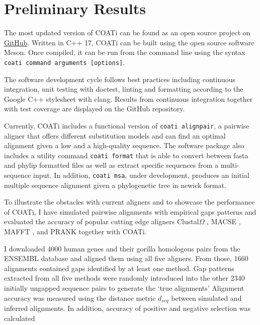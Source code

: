 \section{Preliminary Results}


The most updated version of COATi can be found as an open source project on
\href{https://www.github.com/jgarciamesa/coati}{GitHub}.
Written in C++ 17, COATi can be built using the open source software Meson.
Once compiled, it can be run from the command line using the syntax
\texttt{coati command arguments [options]}.

The software development cycle follows best practices including continuous
integration, unit testing with doctest, linting and formatting according to the
Google C++ stylesheet with clang.
Results from continuous integration together with test coverage are displayed
on the GitHub repository.

Currently, COATi includes a functional version of \texttt{coati alignpair}, a
pairwise aligner that offers different substitution models and can find an
optimal alignment given a low and a high-quality sequence.
The software package also includes a utility command \verb|coati format| that is
able to convert between fasta and phylip formatted files as well as extract
specific sequences from a multi-sequence input.
In addition, \texttt{coati msa}, under development, produces an initial multiple
sequence alignment given a phylogenetic tree in newick format.

To illustrate the obstacles with current aligners and to showcase the
performance of COATi, I have simulated pairwise alignments with empirical gaps
patterns and evaluated the accuracy of popular cutting edge aligners
Clustal$\Omega$ \parencite{clustal_omega_sievers_2011}, MACSE
\parencite{ranwez_macse_2011}, MAFFT \parencite{mafft_katoh_2002}, and PRANK
\parencite{prank_loytynoja_2014} together with COATi.

I downloaded 4000 human genes and their gorilla homologous pairs from the
ENSEMBL database \parencite{ensembl_hubbard_2002} and aligned them using all
five aligners.
From those, 1660 alignments contained gaps identified by at least one method.
Gap patterns extracted from all five methods were randomly introduced into the
other 2340 initially ungapped sequence pairs to generate the `true alignments'
Alignment accuracy was measured using the distance metric $d_{seq}$
\parencite{metrics_blackburne_whelan_2011} between simulated and inferred
alignments.
In addition, accuracy of positive and negative selection was calculated %

